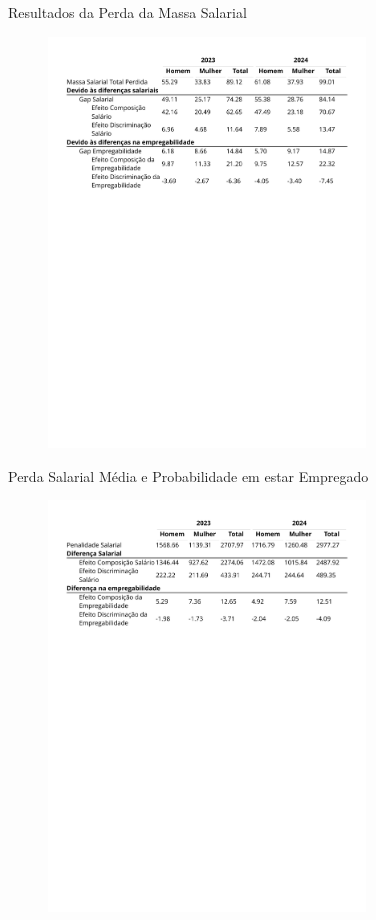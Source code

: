 \documentclass[10pt, xcolor=x11names,compress]{beamer}
\begin{document}
	\begin{frame}{ Resultados da Perda da Massa Salarial}
	\begin{figure}
		\centering
		\includegraphics[width = 0.75\textwidth]{tables_output/table_massa.pdf}
	\end{figure}
	\end{frame}		
	
	\begin{frame}{ Perda Salarial Média e Probabilidade em estar Empregado}
	\begin{figure}
		\centering
		\includegraphics[width = 0.75\textwidth]{tables_output/table_individual.pdf}
	\end{figure}
		\end{frame}	
		
\end{document}
